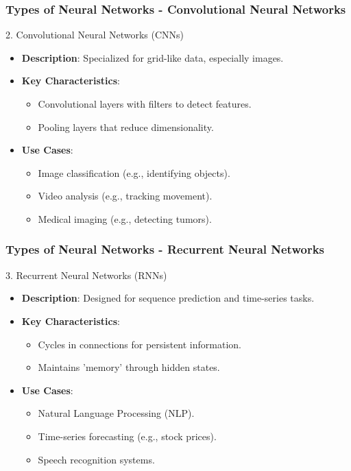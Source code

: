 \documentclass[aspectratio=169]{beamer}
\begin{document}
\begin{frame}[fragile]
    \frametitle{Types of Neural Networks - Convolutional Neural Networks}
    \begin{block}{2. Convolutional Neural Networks (CNNs)}
        \begin{itemize}
            \item \textbf{Description}: Specialized for grid-like data, especially images.
            \item \textbf{Key Characteristics}:
                \begin{itemize}
                    \item Convolutional layers with filters to detect features.
                    \item Pooling layers that reduce dimensionality.
                \end{itemize}
            \item \textbf{Use Cases}:
                \begin{itemize}
                    \item Image classification (e.g., identifying objects).
                    \item Video analysis (e.g., tracking movement).
                    \item Medical imaging (e.g., detecting tumors).
                \end{itemize}
        \end{itemize}
    \end{block}
\end{frame}

\begin{frame}[fragile]
    \frametitle{Types of Neural Networks - Recurrent Neural Networks}
    \begin{block}{3. Recurrent Neural Networks (RNNs)}
        \begin{itemize}
            \item \textbf{Description}: Designed for sequence prediction and time-series tasks.
            \item \textbf{Key Characteristics}:
                \begin{itemize}
                    \item Cycles in connections for persistent information.
                    \item Maintains 'memory' through hidden states.
                \end{itemize}
            \item \textbf{Use Cases}:
                \begin{itemize}
                    \item Natural Language Processing (NLP).
                    \item Time-series forecasting (e.g., stock prices).
                    \item Speech recognition systems.
                \end{itemize}
        \end{itemize}
    \end{block}
\end{frame}
\end{document}
